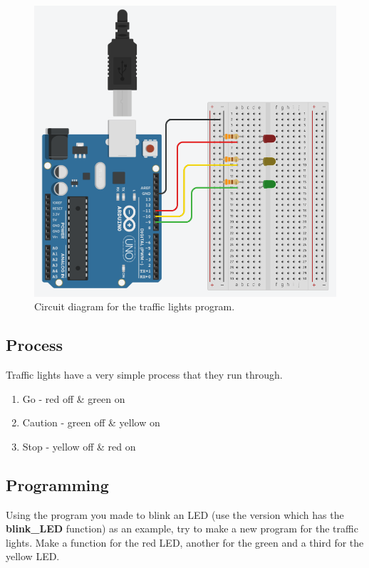 \documentclass[12pt]{article}
\begin{document}
	\begin{figure}[H]
		\begin{center}
			\includegraphics[scale=0.5]{traffic_light}
			\caption{Circuit diagram for the traffic lights program.}
			\label{fig:circuit_traffic_light}
		\end{center}
	\end{figure}
	
	\subsection{Process}
	
	Traffic lights have a very simple process that they run through.
	
	\begin{enumerate}
		\itemsep -1em
		\item Go - red off \& green on
		\item Caution - green off \& yellow on
		\item Stop - yellow off \& red on
	\end{enumerate}
	
	\subsection{Programming}
	
	Using the program you made to blink an LED (use the version which has the \textbf{blink\_LED} function) as an example, try to make a new program for the traffic lights. Make a function for the red LED, another for the green and a third for the yellow LED.
	
\end{document}
